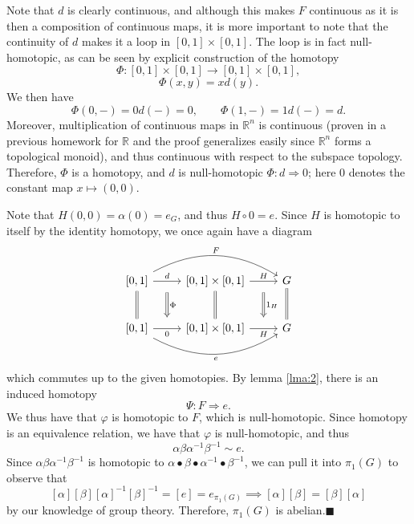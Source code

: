 \documentclass[11pt, letterpaper]{article}
\begin{document}
Note that $d$ is clearly continuous, and although this makes $F$ continuous as it is then a composition of continuous maps, it is more important to note that the continuity of $d$ makes it a loop in $[0,1]\times [0,1]$. The loop is in fact null-homotopic, as can be seen by explicit construction of the homotopy
\[
	\Phi : [0,1]\times [0,1] \to [0,1]\times [0,1],
\]
\[
	\Phi (x,y)=xd(y)
.\]
We then have
\[
	\Phi (0,-)=0d(-)=0,\qquad \Phi (1,-)=1d(-)=d
.\]
Moreover, multiplication of continuous maps in $\mathbb{R}^n $ is continuous (proven in a previous homework for $\mathbb{R} $ and the proof generalizes easily since $\mathbb{R} ^n$ forms a topological monoid), and thus continuous with respect to the subspace topology. Therefore, $\Phi $ is a homotopy, and $d$ is null-homotopic $\Phi : d \Rightarrow 0$; here $0$ denotes the constant map $x\mapsto (0,0)$.

Note that $H(0,0)=\alpha (0)=e_G$, and thus $H\circ 0=e$. Since $H$ is homotopic to itself by the identity homotopy, we once again have a diagram
\[\begin{tikzcd}[row sep = 2.5em, column sep = 2.5em]
	\left[ 0,1 \right] \ar[" d "{name=the}, r] \ar[" F ", bend left, rr] \ar[equals, d]  & \left[ 0,1 \right] \times \left[ 0,1 \right] \ar[" H "{name=h1}, r] \ar[equals, d]  & G\ar[equals, d]  \\
	\left[ 0,1 \right] \ar[" 0 "'{name=a}, r] \ar[" e "', bend right, rr]  & \left[ 0,1 \right] \times \left[ 0,1 \right] \ar[" H "'{name=h2}, r]  & G
	\arrow[from=the, to=a, Rightarrow, " \Phi  ", shorten=10px]
	\arrow[from=h1, to=h2, Rightarrow, " 1_H ", shorten=10px]
\end{tikzcd}\]
which commutes up to the given homotopies. By lemma \ref{lma:2}, there is an induced homotopy
\[
	\Psi : F \Rightarrow e
.\]
We thus have that $\varphi $ is homotopic to $F$, which is null-homotopic. Since homotopy is an equivalence relation, we have that $\varphi $ is null-homotopic, and thus
\[
	\alpha \beta \alpha ^{-1} \beta ^{-1} \sim e
.\]
Since $\alpha \beta \alpha ^{-1} \beta ^{-1} $ is homotopic to $\alpha \bullet \beta \bullet \alpha ^{-1} \bullet \beta ^{-1} $, we can pull it into $\pi _1(G)$ to observe that
\[
	[\alpha ][\beta ][\alpha ]^{-1} [\beta ]^{-1} =[e]=e_{\pi _1(G)} \implies [\alpha ][\beta ]=[\beta ][\alpha ]
\]
by our knowledge of group theory. Therefore, $\pi _1(G)$ is abelian.\hfill$\blacksquare$
\end{document}
